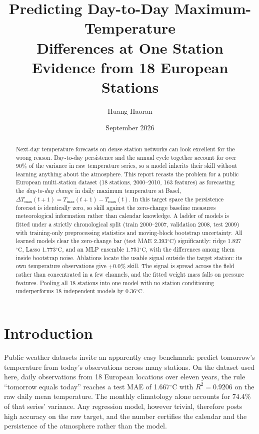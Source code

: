 \documentclass[11pt,a4paper]{article}
\title{\bfseries Predicting Day-to-Day Maximum-Temperature\\
Differences at One Station\\
\normalsize Evidence from 18 European Stations}
\author{Huang Haoran}
\date{September 2026}
\newcommand{\dmax}{\Delta T_{\max}}
\newcommand{\tc}{\ensuremath{^{\circ}\mathrm{C}}}
\begin{document}
\maketitle

\begin{abstract}
Next-day temperature forecasts on dense station networks can look excellent for the wrong reason. Day-to-day persistence and the annual cycle together account for over 90\% of the variance in raw temperature series, so a model inherits their skill without learning anything about the atmosphere. This report recasts the problem for a public European multi-station dataset (18 stations, 2000--2010, 163 features) as forecasting the \emph{day-to-day change} in daily maximum temperature at Basel, $\dmax(t{+}1) = T_{\max}(t{+}1) - T_{\max}(t)$. In this target space the persistence forecast is identically zero, so skill against the zero-change baseline measures meteorological information rather than calendar knowledge. A ladder of models is fitted under a strictly chronological split (train 2000--2007, validation 2008, test 2009) with training-only preprocessing statistics and moving-block bootstrap uncertainty. All learned models clear the zero-change bar (test MAE 2.393\tc) significantly: ridge 1.827\tc{}, Lasso 1.773\tc{}, and an MLP ensemble 1.751\tc{}, with the differences among them inside bootstrap noise. Ablations locate the usable signal outside the target station: its own temperature observations give $+0.0\%$ skill. The signal is spread across the field rather than concentrated in a few channels, and the fitted weight mass falls on pressure features. Pooling all 18 stations into one model with no station conditioning underperforms 18 independent models by 0.36\tc{}.
\end{abstract}

\section{Introduction}
\label{sec:intro}

Public weather datasets invite an apparently easy benchmark: predict tomorrow's temperature from today's observations across many stations. On the dataset used here, daily observations from 18 European locations over eleven years, the rule ``tomorrow equals today'' reaches a test MAE of 1.667\tc{} with $R^2 = 0.9206$ on the raw daily mean temperature. The monthly climatology alone accounts for 74.4\% of that series' variance. Any regression model, however trivial, therefore posts high accuracy on the raw target, and the number certifies the calendar and the persistence of the atmosphere rather than the model.
\end{document}
